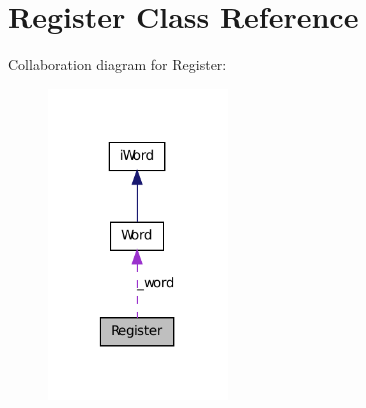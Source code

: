 \hypertarget{classRegister}{
\section{Register Class Reference}
\label{classRegister}
}


Collaboration diagram for Register:
\nopagebreak
\begin{figure}[H]
\begin{center}
\leavevmode
\includegraphics[width=135pt]{classRegister__coll__graph}
\end{center}
\end{figure}
